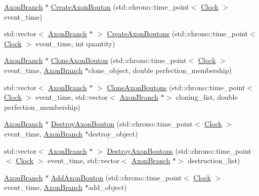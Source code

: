 \begin{DoxyCompactItemize}
\item 
\hyperlink{class_axon_branch}{Axon\+Branch} $\ast$ \hyperlink{class_axon_branch_a30b4602e5dd121666478ff9de52d022b}{Create\+Axon\+Bouton} (std\+::chrono\+::time\+\_\+point$<$ \hyperlink{universe_8h_a0ef8d951d1ca5ab3cfaf7ab4c7a6fd80}{Clock} $>$ event\+\_\+time)
\item 
std\+::vector$<$ \hyperlink{class_axon_branch}{Axon\+Branch} $\ast$ $>$ \hyperlink{class_axon_branch_a77e93626a7993f76e689d09721974e90}{Create\+Axon\+Boutons} (std\+::chrono\+::time\+\_\+point$<$ \hyperlink{universe_8h_a0ef8d951d1ca5ab3cfaf7ab4c7a6fd80}{Clock} $>$ event\+\_\+time, int quantity)
\item 
\hyperlink{class_axon_branch}{Axon\+Branch} $\ast$ \hyperlink{class_axon_branch_ae861207a8a0aeb2b60c305b25248e4b9}{Clone\+Axon\+Bouton} (std\+::chrono\+::time\+\_\+point$<$ \hyperlink{universe_8h_a0ef8d951d1ca5ab3cfaf7ab4c7a6fd80}{Clock} $>$ event\+\_\+time, \hyperlink{class_axon_branch}{Axon\+Branch} $\ast$clone\+\_\+object, double perfection\+\_\+membership)
\item 
std\+::vector$<$ \hyperlink{class_axon_branch}{Axon\+Branch} $\ast$ $>$ \hyperlink{class_axon_branch_a842b3875b2771f4b8e7316bfb9af894c}{Clone\+Axon\+Boutons} (std\+::chrono\+::time\+\_\+point$<$ \hyperlink{universe_8h_a0ef8d951d1ca5ab3cfaf7ab4c7a6fd80}{Clock} $>$ event\+\_\+time, std\+::vector$<$ \hyperlink{class_axon_branch}{Axon\+Branch} $\ast$$>$ cloning\+\_\+list, double perfection\+\_\+membership)
\item 
\hyperlink{class_axon_branch}{Axon\+Branch} $\ast$ \hyperlink{class_axon_branch_a024c8666555702ebe67e2a5caf1b866a}{Destroy\+Axon\+Bouton} (std\+::chrono\+::time\+\_\+point$<$ \hyperlink{universe_8h_a0ef8d951d1ca5ab3cfaf7ab4c7a6fd80}{Clock} $>$ event\+\_\+time, \hyperlink{class_axon_branch}{Axon\+Branch} $\ast$destroy\+\_\+object)
\item 
std\+::vector$<$ \hyperlink{class_axon_branch}{Axon\+Branch} $\ast$ $>$ \hyperlink{class_axon_branch_a8c022977e091b8cab367b21c0c4930ea}{Destroy\+Axon\+Boutons} (std\+::chrono\+::time\+\_\+point$<$ \hyperlink{universe_8h_a0ef8d951d1ca5ab3cfaf7ab4c7a6fd80}{Clock} $>$ event\+\_\+time, std\+::vector$<$ \hyperlink{class_axon_branch}{Axon\+Branch} $\ast$$>$ destruction\+\_\+list)
\item 
\hyperlink{class_axon_branch}{Axon\+Branch} $\ast$ \hyperlink{class_axon_branch_a88e6af84b45bb6f6f8900a6d4aec446c}{Add\+Axon\+Bouton} (std\+::chrono\+::time\+\_\+point$<$ \hyperlink{universe_8h_a0ef8d951d1ca5ab3cfaf7ab4c7a6fd80}{Clock} $>$ event\+\_\+time, \hyperlink{class_axon_branch}{Axon\+Branch} $\ast$add\+\_\+object)

\end{DoxyCompactItemize}
